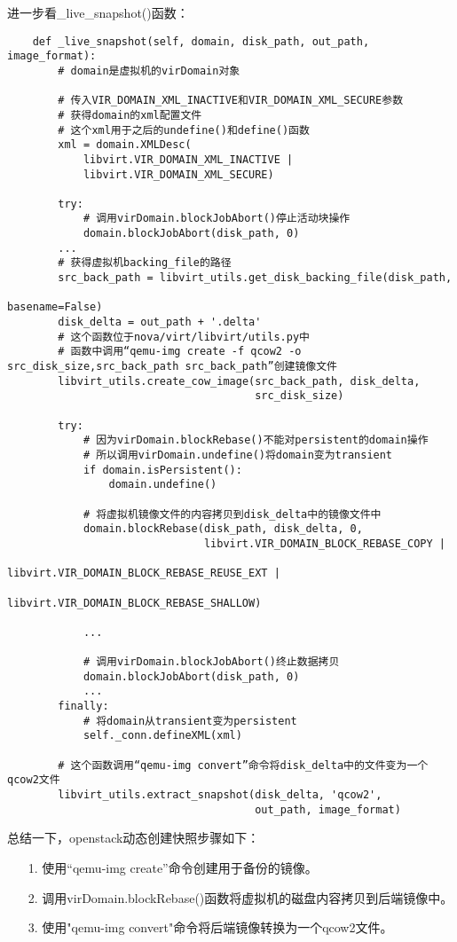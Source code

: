 \documentclass[a4paper,left=1.5cm,right=1.5cm,11pt]{article}
\begin{document}
	进一步看\_live\_snapshot()函数：
	\begin{lstlisting}
	def _live_snapshot(self, domain, disk_path, out_path, image_format):
		# domain是虚拟机的virDomain对象

		# 传入VIR_DOMAIN_XML_INACTIVE和VIR_DOMAIN_XML_SECURE参数
		# 获得domain的xml配置文件
		# 这个xml用于之后的undefine()和define()函数
        xml = domain.XMLDesc(
            libvirt.VIR_DOMAIN_XML_INACTIVE |
            libvirt.VIR_DOMAIN_XML_SECURE)

        try:
			# 调用virDomain.blockJobAbort()停止活动块操作
            domain.blockJobAbort(disk_path, 0)
        ...
		# 获得虚拟机backing_file的路径
        src_back_path = libvirt_utils.get_disk_backing_file(disk_path,
                                                            basename=False)
        disk_delta = out_path + '.delta'
		# 这个函数位于nova/virt/libvirt/utils.py中
		# 函数中调用“qemu-img create -f qcow2 -o src_disk_size,src_back_path src_back_path”创建镜像文件
        libvirt_utils.create_cow_image(src_back_path, disk_delta,
                                       src_disk_size)

        try:
			# 因为virDomain.blockRebase()不能对persistent的domain操作
			# 所以调用virDomain.undefine()将domain变为transient
            if domain.isPersistent():
                domain.undefine()

            # 将虚拟机镜像文件的内容拷贝到disk_delta中的镜像文件中
            domain.blockRebase(disk_path, disk_delta, 0,
                               libvirt.VIR_DOMAIN_BLOCK_REBASE_COPY |
                               libvirt.VIR_DOMAIN_BLOCK_REBASE_REUSE_EXT |
                               libvirt.VIR_DOMAIN_BLOCK_REBASE_SHALLOW)

            ...

			# 调用virDomain.blockJobAbort()终止数据拷贝
            domain.blockJobAbort(disk_path, 0)
            ...
        finally:
			# 将domain从transient变为persistent
            self._conn.defineXML(xml)

        # 这个函数调用“qemu-img convert”命令将disk_delta中的文件变为一个qcow2文件
        libvirt_utils.extract_snapshot(disk_delta, 'qcow2',
                                       out_path, image_format)
	\end{lstlisting}

	总结一下，openstack动态创建快照步骤如下：
	\begin{itemize}
		\item[1.] 使用“qemu-img create”命令创建用于备份的镜像。
		\item[2.] 调用virDomain.blockRebase()函数将虚拟机的磁盘内容拷贝到后端镜像中。
		\item[3.] 使用"qemu-img convert"命令将后端镜像转换为一个qcow2文件。
	\end{itemize}
\end{document}
